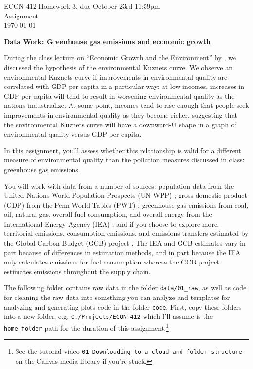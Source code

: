 \noindent
\begin{minipage}[t]{.8\textwidth}
\raggedright
	\Large ECON 412 Homework 3, due October 23rd 11:59pm\\
 	\large Assignment \\
 	\today \\[1.5em] %
\end{minipage}%

\noindent

\textbf{\Large{Data Work: Greenhouse gas emissions and economic growth}}

During the class lecture on ``Economic Growth and the Environment'' by \citet{grossmanEconomicGrowthEnvironment1995}, we discussed the hypothesis of the environmental Kuznets curve. We observe an environmental Kuznets curve if improvements in environmental quality are correlated with GDP per capita in a particular way: at low incomes, increases in GDP per capita will tend to result in worsening environmental quality as the nations industrialize. At some point, incomes tend to rise enough that people seek improvements in environmental quality as they become richer, suggesting that the environmental Kuznets curve will have a downward-U shape in a graph of environmental quality versus GDP per capita.

In this assignment, you'll assess whether this relationship is valid for a different measure of environmental quality than the pollution measures discussed in class: greenhouse gas emissions.

You will work with data from a number of sources: population data from the United Nations World Population Prospects (UN WPP) \citep{undesaWorldPopulationProspects2022}; gross domestic product (GDP) from the Penn World Tables (PWT) \citep{feenstraNextGenerationPenn2015}; greenhouse gas emissions from coal, oil, natural gas, overall fuel consumption, and overall energy  from the International Energy Agency (IEA) \citep{ieaGreenhouseGasEmissions2023}; and if you choose to explore more, territorial emissions, consumption emissions, and emissions transfers estimated by the Global Carbon Budget (GCB) project \citep{petersSynthesisCarbonInternational2012,friedlingsteinGlobalCarbonBudget2022}. The IEA and GCB estimates vary in part because of differences in estimation methods, and in part because the IEA only calculates emissions for fuel consumption whereas the GCB project estimates emissions throughout the supply chain. 

The following folder contains raw data in the folder \verb+data/01_raw+, as well as code for cleaning the raw data into something you can analyze and templates for analyzing and generating plots code in the folder \verb+code+. First, copy these folders into a new folder, e.g. \verb+C:/Projects/ECON-412+ which I'll assume is the \verb+home_folder+ path for the duration of this assignment.\footnote{See the tutorial video \texttt{01\_Downloading to a cloud and folder structure} on the Canvas media library if you're stuck.} 

